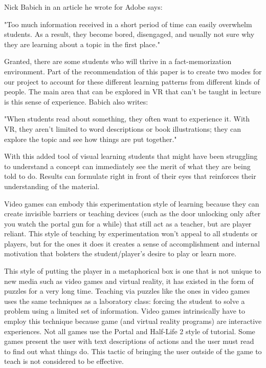\documentclass[onecolumn, draftclsnofoot,10pt, compsoc]{IEEEtran}
\begin{document}
Nick Babich in an article he wrote for Adobe says:
\begin{displayquote}
"Too much information received in a short period of time can easily overwhelm students. As a result, they become bored, disengaged, and usually not sure why they are learning about a topic in the first place." \cite{adobe}
\end{displayquote}
Granted, there are some students who will thrive in a fact-memorization environment. Part of the recommendation of this paper is to create two modes for our project to account for these different learning patterns from different kinds of people. The main area that can be explored in VR that can't be taught in lecture is this sense of experience. Babich also writes:
\begin{displayquote}
"When students read about something, they often want to experience it. With VR, they aren't limited to word descriptions or book illustrations; they can explore the topic and see how things are put together." \cite{adobe}
\end{displayquote}
With this added tool of visual learning students that might have been struggling to understand a concept can immediately see the merit of what they are being told to do. Results can formulate right in front of their eyes that reinforces their understanding of the material.

Video games can embody this experimentation style of learning because they can create invisible barriers or teaching devices (such as the door unlocking only after you watch the portal gun for a while) that still act as a teacher, but are player reliant. This style of teaching by experimentation won't appeal to all students or players, but for the ones it does it creates a sense of accomplishment and internal motivation that bolsters the student/player's desire to play or learn more.

This style of putting the player in a metaphorical box is one that is not unique to new media such as video games and virtual reality, it has existed in the form of puzzles for a very long time. Teaching via puzzles like the ones in video games uses the same techniques as a laboratory class: forcing the student to solve a problem using a limited set of information. Video games intrinsically have to employ this technique because game (and virtual reality programs) are interactive experiences. Not all games use the Portal and Half-Life 2 style of tutorial. Some games present the user with text descriptions of actions and the user must read to find out what things do. This tactic of bringing the user outside of the game to teach is not considered to be effective. \cite{tutorials}
\end{document}
